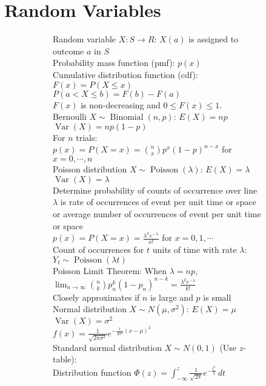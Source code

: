 \documentclass{article}
\DeclareMathOperator{\Var}{Var}
\DeclareMathOperator{\Binomial}{Binomial}
\DeclareMathOperator{\Poisson}{Poisson}
\begin{document}
\section{Random Variables}
\begin{figure}[h!]
    \begin{subfigure}[h!]{0.49\textwidth}
        Random variable $X:S\rightarrow R$: $X(a)$ is assigned to outcome $a$ in $S$\\
        Probability mass function (pmf): $p(x)$\\
        Cumulative distribution function (cdf): $F(x)=P(X\leq x)$\\
        $P(a<X\leq b)=F(b)-F(a)$\\
        $F(x)$ is non-decreasing and $0\leq F(x)\leq 1$.\\
        \newline
        Bernoulli $X\sim\Binomial{(n,p)}$: $E(X)=np$ \quad $\Var(X)=np(1-p)$\\
        For $n$ trials: $p(x)=P(X=x)=\binom{n}{x}p^{x}(1-p)^{n-x}$ for $x=0,\cdots,n$\\
        Poisson distribution $X\sim\Poisson{(\lambda)}$: $E(X)=\lambda$ \quad $\Var(X)=\lambda$\\
        Determine probability of counts of occurrence over line\\
        $\lambda$ is rate of occurrences of event per unit time or space\\
        or average number of occurrences of event per unit time or space\\
        $p(x)=P(X=x)=\frac{\lambda^{x}e^{-\lambda}}{x!}$ for $x=0,1,\cdots$\\
        Count of occurrences for $t$ units of time with rate $\lambda$: $Y_{t}\sim\Poisson{(\lambda t)}$\\
        Poisson Limit Theorem: When $\lambda=np$,\\
        $\lim_{n\to\infty}\binom{n}{k}p^{k}_{n}(1-p_{n})^{n-k}=\frac{\lambda^{k}e^{-\lambda}}{k!}$\\
        Closely approximates if $n$ is large and $p$ is small\\
        Normal distribution $X\sim N(\mu,\sigma^{2})$: $E(X)=\mu$ $\Var{(X)}=\sigma^{2}$\\
        $f(x)=\frac{1}{\sqrt{2\pi\sigma^{2}}}e^{-\frac{1}{2\sigma^{2}}(x-\mu)^{2}}$\\
        Standard normal distribution $X\sim N(0,1)$ (Use $z$-table):\\
        Distribution function $\Phi(z)=\int_{-\infty}^{z}\frac{1}{\sqrt{2\pi}}e^{-\frac{t^{2}}{2}}\,dt$\\

\end{subfigure}
\end{figure}
\end{document}
